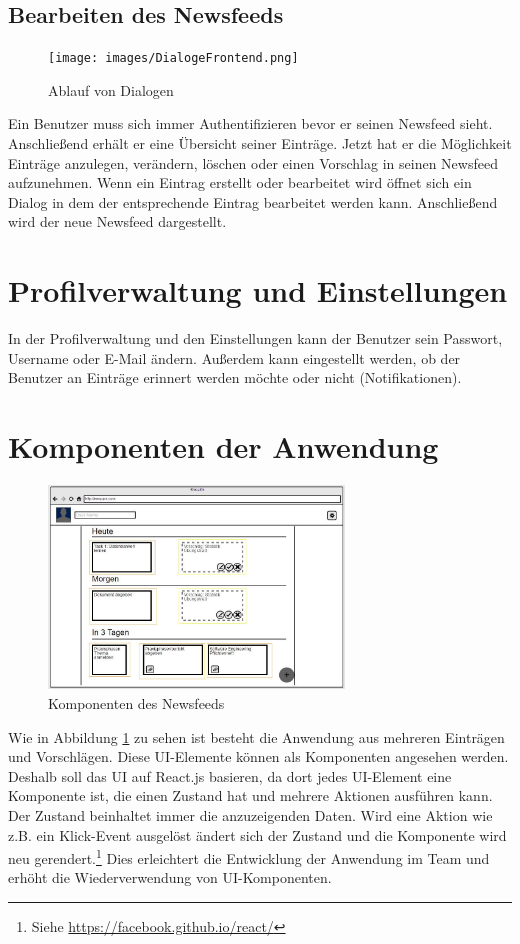 \subsection{Bearbeiten des Newsfeeds}
\begin{figure}[H]
    \centering
    \texttt{[image: images/DialogeFrontend.png]}
    \caption{Ablauf von Dialogen}
\end{figure}

Ein Benutzer muss sich immer Authentifizieren bevor er seinen Newsfeed sieht.
Anschließend erhält er eine Übersicht seiner Einträge. Jetzt hat er die Möglichkeit Einträge anzulegen, verändern, löschen oder einen
Vorschlag in seinen Newsfeed aufzunehmen.
Wenn ein Eintrag erstellt oder bearbeitet wird öffnet sich ein Dialog in dem der entsprechende Eintrag bearbeitet werden kann.
Anschließend wird der neue Newsfeed dargestellt.

\section{Profilverwaltung und Einstellungen}
In der Profilverwaltung und den Einstellungen  kann der Benutzer sein Passwort, Username oder E-Mail ändern. 
Außerdem kann eingestellt werden, ob der Benutzer an Einträge erinnert werden möchte oder nicht (Notifikationen).



\section{Komponenten der Anwendung}
\begin{figure}[H]\label{frontend:mockup}
    \centering
    \includegraphics[width=0.7\textwidth]{images/mock-up.JPG}
    \caption{Komponenten des Newsfeeds}
\end{figure}

Wie in Abbildung \ref{frontend:mockup} zu sehen ist besteht die Anwendung aus mehreren Einträgen und Vorschlägen.
Diese UI-Elemente können als Komponenten angesehen werden.  
Deshalb soll das UI auf React.js basieren, da dort jedes UI-Element eine Komponente ist, die einen Zustand hat und mehrere Aktionen ausführen kann.
Der Zustand beinhaltet immer die anzuzeigenden Daten. Wird eine Aktion wie z.B. ein Klick-Event ausgelöst ändert sich der Zustand und die Komponente wird
neu gerendert.\footnote{Siehe \url{https://facebook.github.io/react/}}
Dies erleichtert die Entwicklung der Anwendung im Team und erhöht die Wiederverwendung von UI-Komponenten.

